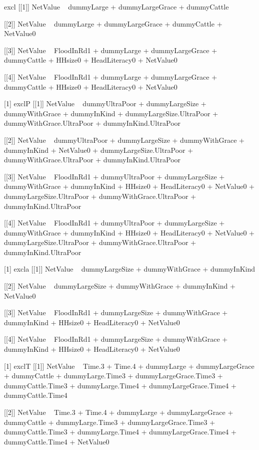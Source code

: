 \begin{Schunk}
\begin{Soutput}
[1] excl
[[1]]
NetValue ~ dummyLarge + dummyLargeGrace + dummyCattle

[[2]]
NetValue ~ dummyLarge + dummyLargeGrace + dummyCattle + NetValue0

[[3]]
NetValue ~ FloodInRd1 + dummyLarge + dummyLargeGrace + dummyCattle + 
    HHsize0 + HeadLiteracy0 + NetValue0

[[4]]
NetValue ~ FloodInRd1 + dummyLarge + dummyLargeGrace + dummyCattle + 
    HHsize0 + HeadLiteracy0 + NetValue0

[1] exclP
[[1]]
NetValue ~ dummyUltraPoor + dummyLargeSize + dummyWithGrace + 
    dummyInKind + dummyLargeSize.UltraPoor + dummyWithGrace.UltraPoor + 
    dummyInKind.UltraPoor

[[2]]
NetValue ~ dummyUltraPoor + dummyLargeSize + dummyWithGrace + 
    dummyInKind + NetValue0 + dummyLargeSize.UltraPoor + dummyWithGrace.UltraPoor + 
    dummyInKind.UltraPoor

[[3]]
NetValue ~ FloodInRd1 + dummyUltraPoor + dummyLargeSize + dummyWithGrace + 
    dummyInKind + HHsize0 + HeadLiteracy0 + NetValue0 + dummyLargeSize.UltraPoor + 
    dummyWithGrace.UltraPoor + dummyInKind.UltraPoor

[[4]]
NetValue ~ FloodInRd1 + dummyUltraPoor + dummyLargeSize + dummyWithGrace + 
    dummyInKind + HHsize0 + HeadLiteracy0 + NetValue0 + dummyLargeSize.UltraPoor + 
    dummyWithGrace.UltraPoor + dummyInKind.UltraPoor

[1] excla
[[1]]
NetValue ~ dummyLargeSize + dummyWithGrace + dummyInKind

[[2]]
NetValue ~ dummyLargeSize + dummyWithGrace + dummyInKind + NetValue0

[[3]]
NetValue ~ FloodInRd1 + dummyLargeSize + dummyWithGrace + dummyInKind + 
    HHsize0 + HeadLiteracy0 + NetValue0

[[4]]
NetValue ~ FloodInRd1 + dummyLargeSize + dummyWithGrace + dummyInKind + 
    HHsize0 + HeadLiteracy0 + NetValue0

[1] exclT
[[1]]
NetValue ~ Time.3 + Time.4 + dummyLarge + dummyLargeGrace + dummyCattle + 
    dummyLarge.Time3 + dummyLargeGrace.Time3 + dummyCattle.Time3 + 
    dummyLarge.Time4 + dummyLargeGrace.Time4 + dummyCattle.Time4

[[2]]
NetValue ~ Time.3 + Time.4 + dummyLarge + dummyLargeGrace + dummyCattle + 
    dummyLarge.Time3 + dummyLargeGrace.Time3 + dummyCattle.Time3 + 
    dummyLarge.Time4 + dummyLargeGrace.Time4 + dummyCattle.Time4 + 
    NetValue0


\end{Soutput}
\end{Schunk}
